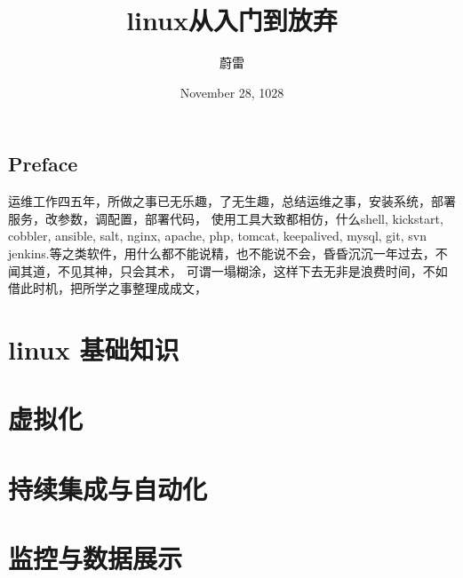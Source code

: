 \documentclass[11pt,a4paper]{book}
\title{linux从入门到放弃}
\author{蔚雷}
\date{November 28, 1028}
\begin{document}
\maketitle

\tableofcontents 

\mainmatter

\chapter*{Preface} 
运维工作四五年，所做之事已无乐趣，了无生趣，总结运维之事，安装系统，部署服务，改参数，调配置，部署代码，
使用工具大致都相仿，什么shell, kickstart, cobbler, ansible, salt, nginx, apache, php, tomcat, keepalived, mysql, git, svn 
jenkins.等之类软件，用什么都不能说精，也不能说不会，昏昏沉沉一年过去，不闻其道，不见其神，只会其术，
可谓一塌糊涂，这样下去无非是浪费时间，不如借此时机，把所学之事整理成成文，

\part{linux 基础知识}








\part{虚拟化}



\part{持续集成与自动化}


\part{监控与数据展示}


\end{document}
